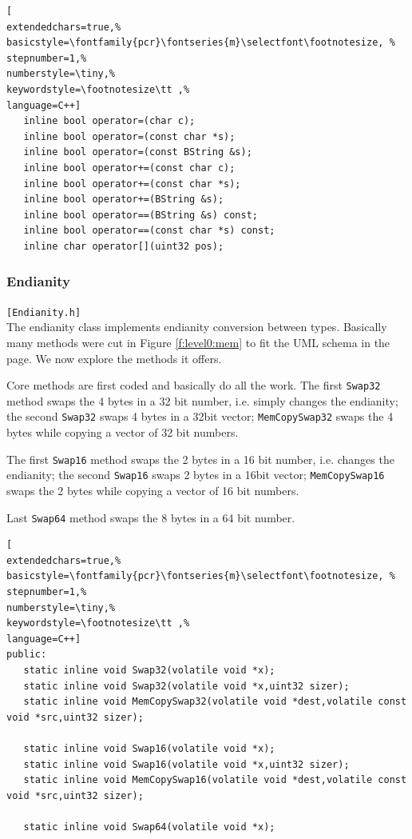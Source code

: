 \begin{lstlisting}[
extendedchars=true,%
basicstyle=\fontfamily{pcr}\fontseries{m}\selectfont\footnotesize, %
stepnumber=1,%
numberstyle=\tiny,%
keywordstyle=\footnotesize\tt ,%
language=C++]
   inline bool operator=(char c);
   inline bool operator=(const char *s);
   inline bool operator=(const BString &s);
   inline bool operator+=(const char c);
   inline bool operator+=(const char *s);
   inline bool operator+=(BString &s);
   inline bool operator==(BString &s) const;
   inline bool operator==(const char *s) const;
   inline char operator[](uint32 pos);
\end{lstlisting}



\subsubsection{Endianity}
\texttt{[Endianity.h]}\\
The endianity class implements endianity conversion between types. Basically many methods were cut in Figure \ref{f:level0:mem} to fit the UML schema in the page. We now explore the methods it offers.

Core methods are first coded and basically do all the work. The first \texttt{Swap32} method swaps the 4 bytes in a 32 bit number, i.e. simply changes the endianity; the second \texttt{Swap32} swaps 4 bytes in a 32bit vector; \texttt{MemCopySwap32} swaps the 4 bytes while copying a vector of 32 bit numbers.

The first \texttt{Swap16} method swaps the 2 bytes in a 16 bit number, i.e. changes the endianity; the second \texttt{Swap16} swaps 2 bytes in a 16bit vector; \texttt{MemCopySwap16} swaps the 2 bytes while copying a vector of 16 bit numbers.

Last \texttt{Swap64} method swaps the 8 bytes in a 64 bit number.

\begin{lstlisting}[
extendedchars=true,%
basicstyle=\fontfamily{pcr}\fontseries{m}\selectfont\footnotesize, %
stepnumber=1,%
numberstyle=\tiny,%
keywordstyle=\footnotesize\tt ,%
language=C++]
public:
   static inline void Swap32(volatile void *x);
   static inline void Swap32(volatile void *x,uint32 sizer);
   static inline void MemCopySwap32(volatile void *dest,volatile const void *src,uint32 sizer);

   static inline void Swap16(volatile void *x);
   static inline void Swap16(volatile void *x,uint32 sizer);
   static inline void MemCopySwap16(volatile void *dest,volatile const void *src,uint32 sizer);

   static inline void Swap64(volatile void *x);
\end{lstlisting}

